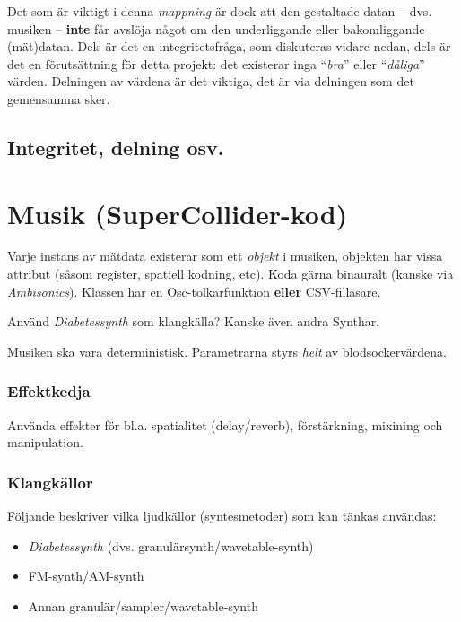 Det som är viktigt i denna \emph{mappning} är dock att den gestaltade
datan -- dvs. musiken -- \textbf{inte} får avslöja något om den
underliggande eller bakomliggande (mät)datan. Dels är det en
integritetsfråga, som diskuteras vidare nedan, dels är det en
förutsättning för detta projekt: det existerar inga ``\emph{bra}'' eller
``\emph{dåliga}'' värden. Delningen av värdena är det viktiga, det är
via delningen som det gemensamma sker.

\hypertarget{integritet-delning-osv.}{%
\subsection{Integritet, delning osv.}\label{integritet-delning-osv.}}

\hypertarget{musik-supercollider-kod}{%
\section{Musik (SuperCollider-kod)}\label{musik-supercollider-kod}}

Varje instans av mätdata existerar som ett \emph{objekt} i musiken,
objekten har vissa attribut (såsom register, spatiell kodning, etc).
Koda gärna binauralt (kanske via \emph{Ambisonics}). Klassen har en
Osc-tolkarfunktion \textbf{eller} CSV-filläsare.

Använd \emph{Diabetessynth} som klangkälla? Kanske även andra Synthar.

Musiken ska vara deterministisk. Parametrarna styrs \emph{helt} av
blodsockervärdena.

\hypertarget{effektkedja}{%
\subsubsection{Effektkedja}\label{effektkedja}}

Använda effekter för bl.a. spatialitet (delay/reverb), förstärkning,
mixining och manipulation.

\hypertarget{klangkuxe4llor}{%
\subsubsection{Klangkällor}\label{klangkuxe4llor}}

Följande beskriver vilka ljudkällor (syntesmetoder) som kan tänkas
användas:

\begin{itemize}
\tightlist
\item
  \emph{Diabetessynth} (dvs. granulärsynth/wavetable-synth)
\item
  FM-synth/AM-synth
\item
  Annan granulär/sampler/wavetable-synth
\end{itemize}

